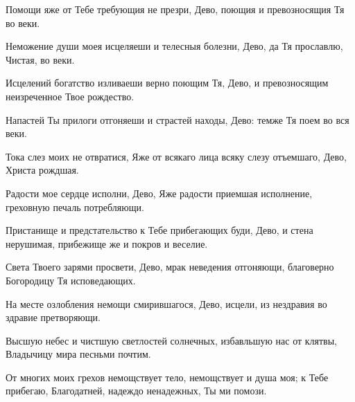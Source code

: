 \begin{mymulticols}



Помощи яже от Тебе требующия не презри, Дево, поющия и превозносящия Тя во веки.


Неможение души моея исцеляеши и телесныя болезни, Дево, да Тя прославлю, Чистая, во веки.

\slava

Исцелений богатство изливаеши верно поющим Тя, Дево, и превозносящим неизреченное Твое рождество.

\inyne

Напастей Ты прилоги отгоняеши и страстей находы, Дево: темже Тя поем во вся веки.




Тока слез моих не отвратися, Яже от всякаго лица всяку слезу отъемшаго, Дево, Христа рождшая.


Радости мое сердце исполни, Дево, Яже радости приемшая исполнение, греховную печаль потребляющи.


Пристанище и предстательство к Тебе прибегающих буди, Дево, и стена нерушимая, прибежище же и покров и веселие.

\slava

Света Твоего зарями просвети, Дево, мрак неведения отгоняющи, благоверно Богородицу Тя исповедающих.

\inyne

На месте озлобления немощи смирившагося, Дево, исцели, из нездравия во здравие претворяющи.


Высшую небес и чистшую светлостей солнечных, избавльшую нас от клятвы, Владычицу мира песньми почтим.

От многих моих грехов немощствует тело, немощствует и душа моя; к Тебе прибегаю, Благодатней, надеждо ненадежных, Ты ми помози.


\end{mymulticols}
